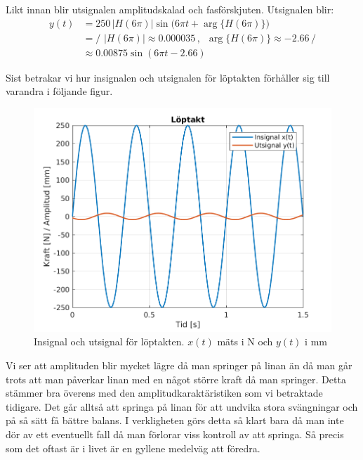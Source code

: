 Likt innan blir utsignalen amplitudskalad och fasförskjuten. Utsignalen blir:
$$\begin{aligned}
y(t)&=250\,\big|H(6\pi)\big|\sin\big(6\pi t+\arg\big\{H(6\pi)\big\}\big)
\\&=\bigg/ \,\,\big|H(6\pi)\big|\approx 0.000035 \,,\,\,\, \arg\big\{H(6\pi)\big\}\approx -2.66  \,\bigg/
\\&\approx 0.00875\sin(6\pi t - 2.66)\end{aligned}$$

\newpage

Sist betrakar vi hur insignalen och utsignalen för löptakten förhåller sig till varandra i följande figur.
\begin{figure}[H]
    \centering
     \includegraphics[scale=0.9]{bilder/sinusfunktion_loptakt}
    \caption{Insignal och utsignal för löptakten. $x(t)$ mäts i N och $y(t)$ i mm}
    \label{fig:sinusfunktion_loptakt}
\end{figure}

Vi ser att amplituden blir mycket lägre då man springer på linan än då man går trots att man påverkar linan med en något större kraft då man springer. Detta stämmer bra överens med den amplitudkaraktäristiken som vi betraktade tidigare. Det går alltså att springa på linan för att undvika stora svängningar och på så sätt få bättre balans.
I verkligheten görs detta så klart bara då man inte dör av ett eventuellt fall då man förlorar viss kontroll av att springa. Så precis som det oftast är i livet är en gyllene medelväg att föredra. 